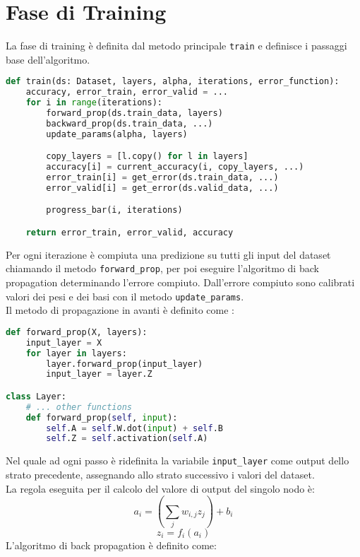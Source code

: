 \section{Fase di Training}
La fase di training è definita dal metodo principale \texttt{train} e definisce i passaggi base dell'algoritmo.
\begin{lstlisting}[language=Python]
def train(ds: Dataset, layers, alpha, iterations, error_function):
    accuracy, error_train, error_valid = ...
    for i in range(iterations):
        forward_prop(ds.train_data, layers)
        backward_prop(ds.train_data, ...)
        update_params(alpha, layers)

        copy_layers = [l.copy() for l in layers]
        accuracy[i] = current_accuracy(i, copy_layers, ...)
        error_train[i] = get_error(ds.train_data, ...)
        error_valid[i] = get_error(ds.valid_data, ...)

        progress_bar(i, iterations)

    return error_train, error_valid, accuracy
\end{lstlisting}
Per ogni iterazione è compiuta una predizione su tutti gli input del dataset chiamando il metodo \texttt{forward\_prop}, per poi eseguire l'algoritmo di back propagation determinando l'errore compiuto. Dall'errore compiuto sono calibrati valori dei pesi e dei basi con il metodo \texttt{update\_params}. \\
Il metodo di propagazione in avanti è definito come :
\begin{lstlisting}[language=Python]
def forward_prop(X, layers):
    input_layer = X
    for layer in layers:
        layer.forward_prop(input_layer)
        input_layer = layer.Z

class Layer:
    # ... other functions
    def forward_prop(self, input):
        self.A = self.W.dot(input) + self.B
        self.Z = self.activation(self.A)
\end{lstlisting}
Nel quale ad ogni passo è ridefinita la variabile \texttt{input\_layer} come output dello strato precedente, assegnando allo strato successivo i valori del dataset. \\
La regola eseguita per il calcolo del valore di output del singolo nodo è:
\begin{equation}
a_{i} = (\sum_{j} w_{i,j} z_j ) + b_i
\end{equation}
\begin{equation}
z_{i} = f_i(a_i)
\end{equation}
L'algoritmo di back propagation è definito come:
